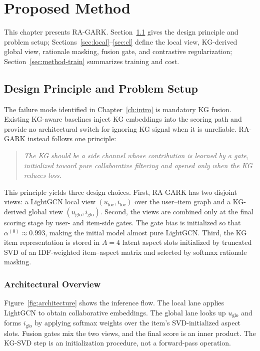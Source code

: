 \chapter{Proposed Method}
\label{ch:methodology}
\label{ch:architecture}

This chapter presents RA-GARK. Section~\ref{sec:approach-principle} gives the design principle and problem setup; Sections~\ref{sec:local}--\ref{sec:cl} define the local view, KG-derived global view, rationale masking, fusion gate, and contrastive regularization; Section~\ref{sec:method-train} summarizes training and cost.

\section{Design Principle and Problem Setup}
\label{sec:approach-principle}

The failure mode identified in Chapter~\ref{ch:intro} is mandatory KG fusion. Existing KG-aware baselines inject KG embeddings into the scoring path and provide no architectural switch for ignoring KG signal when it is unreliable. RA-GARK instead follows one principle:

\begin{quote}
\emph{The KG should be a side channel whose contribution is learned by a gate, initialized toward pure collaborative filtering and opened only when the KG reduces loss.}
\end{quote}

This principle yields three design choices. First, RA-GARK has two disjoint views: a LightGCN local view $(u_{\mathrm{loc}}, i_{\mathrm{loc}})$ over the user--item graph and a KG-derived global view $(u_{\mathrm{glo}}, i_{\mathrm{glo}})$. Second, the views are combined only at the final scoring stage by user- and item-side gates. The gate bias is initialized so that $\alpha^{(0)} \approx 0.993$, making the initial model almost pure LightGCN. Third, the KG item representation is stored in $A=4$ latent aspect slots initialized by truncated SVD of an IDF-weighted item--aspect matrix and selected by softmax rationale masking.

\subsection{Architectural Overview}
\label{sec:approach-overview}

Figure~\ref{fig:architecture} shows the inference flow. The local lane applies LightGCN to obtain collaborative embeddings. The global lane looks up $u_{\mathrm{glo}}$ and forms $i_{\mathrm{glo}}$ by applying softmax weights over the item's SVD-initialized aspect slots. Fusion gates mix the two views, and the final score is an inner product. The KG-SVD step is an initialization procedure, not a forward-pass operation.

